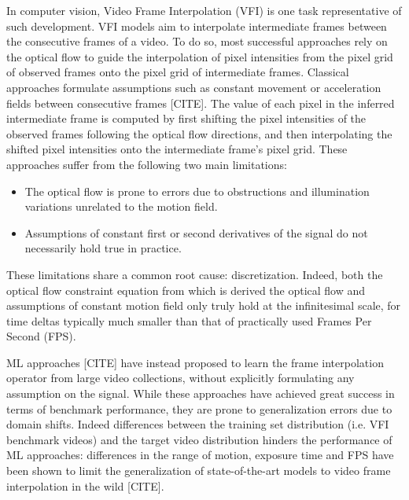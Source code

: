 \documentclass{article}
\begin{document}
In computer vision, Video Frame Interpolation (VFI) is one task representative of such development.
VFI models aim to interpolate intermediate frames between the consecutive frames of a video.
To do so, most successful approaches rely on the optical flow
to guide the interpolation of pixel intensities from the pixel grid of observed frames onto the pixel grid of intermediate frames.
Classical approaches formulate assumptions such as constant movement or acceleration fields between consecutive frames [CITE].
The value of each pixel in the inferred intermediate frame is computed by first shifting the pixel intensities of the observed frames following the
optical flow directions, and then interpolating the shifted pixel intensities onto the intermediate frame's pixel grid.
These approaches suffer from the following two main limitations:

\begin{itemize}
\item The optical flow is prone to errors due to obstructions and illumination variations unrelated to the motion field.
\item Assumptions of constant first or second derivatives of the signal do not necessarily hold true in practice.
\end{itemize}

These limitations share a common root cause: discretization.
Indeed, both the optical flow constraint equation from which is derived the optical flow
and assumptions of constant motion field only truly hold at the infinitesimal scale,
for time deltas typically much smaller than that of practically used Frames Per Second (FPS).

ML approaches [CITE] have instead proposed to learn the frame interpolation operator from large video collections,
without explicitly formulating any assumption on the signal.
While these approaches have achieved great success in terms of benchmark performance,
they are prone to generalization errors due to domain shifts. %
Indeed differences between the training set distribution (i.e. VFI benchmark videos) and the target video distribution hinders the performance of ML approaches:
differences in the range of motion, exposure time and FPS have been shown to limit the
generalization of state-of-the-art models to video frame interpolation in the wild [CITE]. %
\end{document}

